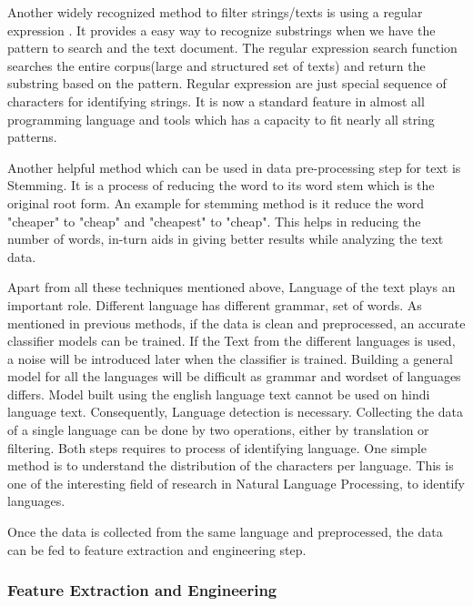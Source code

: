 Another widely recognized method to filter strings/texts is using a regular expression \cite{Thompson}. It provides a easy way to recognize substrings when we have the pattern to search and the text document. The regular expression search function searches the entire corpus(large and structured set of texts) and return the substring based on the pattern. Regular expression are just special sequence of characters for identifying strings. It is now a standard feature in almost all programming language and tools which has a capacity to fit nearly all string patterns.   

Another helpful method which can be used in data pre-processing step for text is Stemming. It is a process of reducing the word to its word stem which is the original root form. An example for stemming method is it reduce the word "cheaper" to "cheap" and "cheapest" to "cheap". This helps in reducing the number of words, in-turn aids in giving better results while analyzing the text data.

Apart from all these techniques mentioned above, Language of the text plays an important role. Different language has different grammar, set of words. As mentioned in previous methods, if the data is clean and preprocessed, an  accurate classifier models can be trained. If the Text from the different languages is used, a noise will be introduced later when the classifier is trained. Building a general model for all the languages will be difficult as grammar and wordset of languages differs. Model built using the english language text cannot be used on hindi language text. Consequently, Language detection is necessary. Collecting the data of a single language can be done by two operations, either by translation or filtering. Both steps requires to process of identifying language. One simple method is to understand the distribution of the characters per language. This is one of the interesting field of research in Natural Language Processing, to identify languages. 

Once the data is collected from the same language and preprocessed, the data can be fed to feature extraction and engineering step.

\subsubsection{Feature Extraction and Engineering}

